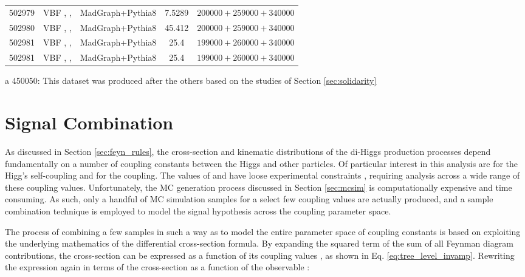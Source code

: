 \begin{table}[tbh]
\begin{center}
\begin{tabular}{l l l S l}
               502979  &	VBF , ,   &  MadGraph+Pythia8 &	7.5289  & $200000  +259000  +340000  $\\
               502980  &	VBF , ,   &  MadGraph+Pythia8 &	45.412  & $200000  +259000  +340000  $\\
               502981  &	VBF , ,     &  MadGraph+Pythia8 &	25.4    & $199000  +260000  +340000  $\\
               502981  &	VBF , ,  &  MadGraph+Pythia8 &	25.4    & $199000  +260000  +340000  $\\ %
           \bottomrule
           \end{tabular}
           \begin{tablenotes}
            \item[a] 450050: This dataset was produced after the others based on the studies of Section \ref{sec:solidarity}
          \end{tablenotes}
       \end{center}
    \end{table}



\FloatBarrier
\section{Signal Combination} \label{sec:signal_combination}

    As discussed in Section \ref{sec:feyn_rules},
        the cross-section and kinematic distributions of the di-Higgs production processes
        depend fundamentally on a number of coupling constants between the Higgs and other particles.
    Of particular interest in this analysis are \kl for the Higg's self-coupling and \kvv for the \HHVV coupling.
    The values of \kl and \kvv have loose experimental constraints \cite{EXOT-2016-31} \cite{HDBS-2018-18-witherratum} \cite{ATLAS-CONF-2019-049},
        requiring analysis across a wide range of these coupling values.
    Unfortunately, the MC generation process discussed in Section \ref{sec:mcsim} is computationally expensive and time consuming.
    As such, only a handful of MC simulation samples for a select few coupling values are actually produced,
        and a sample combination technique is employed to model the signal hypothesis across the coupling parameter space.

    The process of combining a few samples in such a way as to model the entire parameter space of coupling constants is based on exploiting the underlying mathematics of the differential cross-section formula.
    By expanding the squared term of the sum of all Feynman diagram contributions,
        the cross-section can be expressed as a function of its coupling values \cite{ATLAS-CONF-2019-049}, as shown in Eq. \ref{eq:tree_level_invamp}.
    Rewriting the expression again in terms of the cross-section as a function of the observable \mhh:

